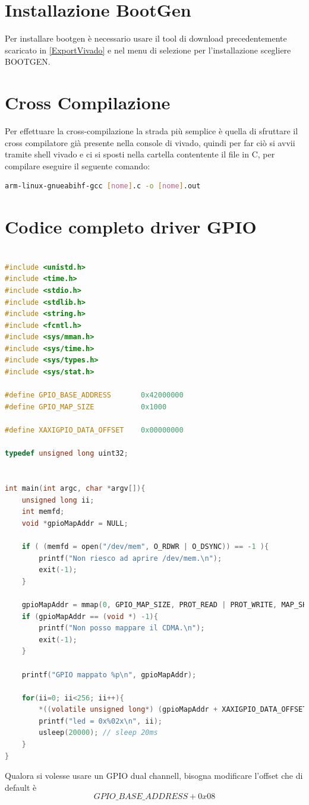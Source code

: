 \section{Installazione BootGen}
\label{installazioneBoot}
Per installare bootgen è necessario usare il tool di download precedentemente scaricato in \ref{ExportVivado} e nel menu di selezione per l'installazione scegliere BOOTGEN.


\section{Cross Compilazione}
\label{crossComp}
Per effettuare la cross-compilazione la strada più semplice è quella di sfruttare il cross compilatore già presente nella console di vivado, quindi per far ciò si avvii tramite shell vivado e ci si sposti nella cartella contentente il file in C, per compilare eseguire il seguente comando:
\begin{lstlisting}[language=sh, label=lst:sh, caption={Cross-compilazione}]
arm-linux-gnueabihf-gcc [nome].c -o [nome].out
\end{lstlisting}

\section{Codice completo driver GPIO}
\label{GPIO}
\begin{lstlisting}[language=c, label=lst:sh, caption={Codice completo del driver GPIO}]

#include <unistd.h>
#include <time.h>
#include <stdio.h>
#include <stdlib.h>
#include <string.h>
#include <fcntl.h>
#include <sys/mman.h>
#include <sys/time.h>
#include <sys/types.h>
#include <sys/stat.h>

#define GPIO_BASE_ADDRESS       0x42000000
#define GPIO_MAP_SIZE           0x1000

#define XAXIGPIO_DATA_OFFSET    0x00000000

typedef unsigned long uint32;


int main(int argc, char *argv[]){
    unsigned long ii;
    int memfd;
    void *gpioMapAddr = NULL;

    if ( (memfd = open("/dev/mem", O_RDWR | O_DSYNC)) == -1 ){
        printf("Non riesco ad aprire /dev/mem.\n");
        exit(-1);
    }

    gpioMapAddr = mmap(0, GPIO_MAP_SIZE, PROT_READ | PROT_WRITE, MAP_SHARED, memfd, GPIO_BASE_ADDRESS);
    if (gpioMapAddr == (void *) -1){
        printf("Non posso mappare il CDMA.\n");
        exit(-1);
    }
    
    printf("GPIO mappato %p\n", gpioMapAddr);

    for(ii=0; ii<256; ii++){
        *((volatile unsigned long*) (gpioMapAddr + XAXIGPIO_DATA_OFFSET)) = ii;
        printf("led = 0x%02x\n", ii);
        usleep(20000); // sleep 20ms
    }
}

\end{lstlisting}
Qualora si volesse usare un GPIO dual channell, bisogna modificare l'offset che di default è 
$$GPIO\_BASE\_ADDRESS+ 0x08$$


